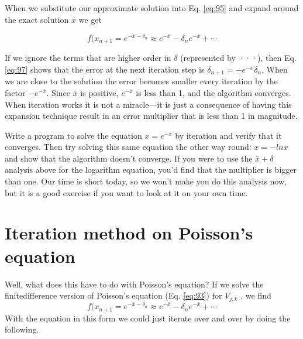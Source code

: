 When we substitute our approximate solution into 
Eq. \eqref{eq:95} and 
expand around the exact solution $ \bar{x} $ we get

\begin{equation}\label{eq:97}
f(x_{n+1}=e^{-\bar{x}-\delta_{n}} \approx e^{-\bar{x}}-\delta_{n} e^{-\bar{x}}+\cdots
\end{equation}

If we ignore the terms that are higher order in $\delta$ (represented by ···), then Eq. \eqref{eq:97}
shows that the error at the next iteration step is $\delta_{n+1} = −e^{−\bar{x}}\delta_n$. When we are close
to the solution the error becomes smaller every iteration by the factor $−e^{-\bar{x}}$. Since $\bar{x}$ is positive, $e^{-\bar{x}}$ is less than 1, and the algorithm converges. When iteration works
it is not a miracle—it is just a consequence of having this expansion technique
result in an error multiplier that is less than 1 in magnitude.

\begin{problem}\label{P9.1}
Write a program to solve the equation $x = e^{−x}$ by iteration and verify that
it converges. Then try solving this same equation the other way round:
$x = −ln x$ and show that the algorithm doesn\rq t converge. If you were to
use the $\bar{x} +\delta$ analysis above for the logarithm equation, you\rq d find that the
multiplier is bigger than one. Our time is short today, so we won\rq t make you
do this analysis now, but it is a good exercise if you want to look at it on
your own time.
\end{problem}

\section*{Iteration method on Poisson\rq s equation}
Well, what does this have to do with Poisson\rq s equation? If we solve the finitedifference version of Poisson\rq s equation (Eq. \eqref{eq:93}) for $V_{j,k}$ , we find
\begin{equation}\label{eq:98}
f(x_{n+1}=e^{-\bar{x}-\delta_{n}} \approx e^{-\bar{x}}-\delta_{n} e^{-\bar{x}}+\cdots
\end{equation}
With the equation in this form we could just iterate over and over by doing the
following.

